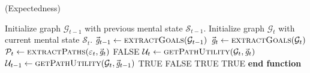 \documentclass{article}
\begin{document}
\begin{algorithm}
	\caption{(Expectedness)}
	\label{array-sum}
	\begin{algorithmic}[1]
			\Statex
			\State Initialize graph $\mathcal{G}_{t-1}$ with previous mental state
			$\mathcal{S}_{t-1}$.
			\State Initialize graph $\mathcal{G}_{t}$ with current mental state
			$\mathcal{S}_{t}$.
			\Statex
			\State $\vec{\mathit{g}}_{t-1} \gets \Call{extractGoals}{\mathcal{G}_{t-1}}$
			\State $\vec{\mathit{g}}_{t} \gets \Call{extractGoals}{\mathcal{G}_{t}}$
			\Statex
					\State $\mathcal{P}_{t} \gets \Call{extractPaths}{\varepsilon_t,
					\vec{\mathit{g}}_{t}}$
						\State \Return FALSE
					\Else
						\State $\mathcal{U}_{t} \gets
						\Call{getPathUtility}{\mathcal{G}_{t}, \vec{\mathit{g}}_{t}}$
						\State $\mathcal{U}_{t-1} \gets \Call{getPathUtility}{\mathcal{G}_{t},
						\vec{\mathit{g}}_{t-1}}$
							\State \Return TRUE
						\Else
							\State \Return FALSE
						\EndIf
					\EndIf
				\Else {}
					\State \Return TRUE
				\EndIf
			\Else {}
				\State \Return TRUE
			\EndIf
		\EndFunction
		\State \textbf{end function}
	\end{algorithmic}
\end{algorithm}

\pagebreak
\end{document}
